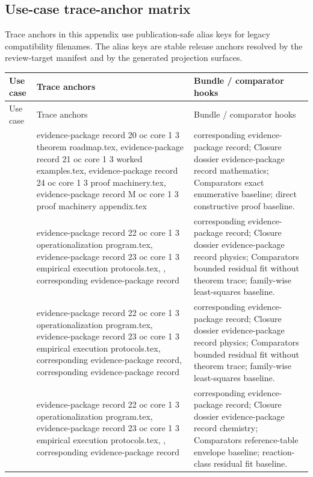 \begin{longtable}{@{}L{0.13\textwidth}L{0.14\textwidth}L{0.12\textwidth}L{0.18\textwidth}L{0.17\textwidth}L{0.20\textwidth}@{}}
\bottomrule
\end{longtable}

\subsection{Use-case trace-anchor matrix}
Trace anchors in this appendix use publication-safe alias keys for legacy compatibility filenames. The alias keys are stable release anchors resolved by the review-target manifest and by the generated projection surfaces.
\begin{longtable}{@{}L{0.16\textwidth}L{0.38\textwidth}L{0.34\textwidth}@{}}
\toprule
Use case & Trace anchors & Bundle / comparator hooks \\
\midrule
\endfirsthead
\toprule
Use case & Trace anchors & Bundle / comparator hooks \\
\midrule
\endhead
{} & evidence-package record 20 oc core 1 3 theorem roadmap.tex, \allowbreak evidence-package record 21 oc core 1 3 worked examples.tex, \allowbreak evidence-package record 24 oc core 1 3 proof machinery.tex, \allowbreak evidence-package record M oc core 1 3 proof machinery appendix.tex & corresponding evidence-package record; Closure dossier evidence-package record mathematics; Comparators exact enumerative baseline; direct constructive proof baseline. \\
 & evidence-package record 22 oc core 1 3 operationalization program.tex, \allowbreak evidence-package record 23 oc core 1 3 empirical execution protocols.tex, \allowbreak {}, corresponding evidence-package record & corresponding evidence-package record; Closure dossier evidence-package record physics; Comparators bounded residual fit without theorem trace; family-wise least-squares baseline. \\
 & evidence-package record 22 oc core 1 3 operationalization program.tex, \allowbreak evidence-package record 23 oc core 1 3 empirical execution protocols.tex, corresponding evidence-package record, corresponding evidence-package record & corresponding evidence-package record; Closure dossier evidence-package record physics; Comparators bounded residual fit without theorem trace; family-wise least-squares baseline. \\
 & evidence-package record 22 oc core 1 3 operationalization program.tex, \allowbreak evidence-package record 23 oc core 1 3 empirical execution protocols.tex, \allowbreak {}, corresponding evidence-package record & corresponding evidence-package record; Closure dossier evidence-package record chemistry; Comparators reference-table envelope baseline; reaction-class residual fit baseline. \\

\end{longtable}
